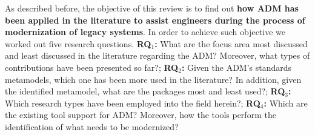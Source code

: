 

As described before, the objective of this review is to find out \textbf{how ADM has been applied in the literature to assist engineers during the process of modernization of legacy systems}. In order to achieve such objective we worked out five research questions. \textbf{RQ$_1$:} What are the focus area most discussed and least discussed in the literature regarding the ADM? Moreover, what types of contributions have been presented so far?; \textbf{RQ$_2$:} Given the ADM's standards metamodels, which one has been more used in the literature? In addition, given the identified metamodel, what are the packages most and least used?; \textbf{RQ$_3$:} Which research types have been employed into the field herein?; \textbf{RQ$_4$:} Which are the existing tool support for ADM? Moreover, how the tools perform the identification of what needs to be modernized?










